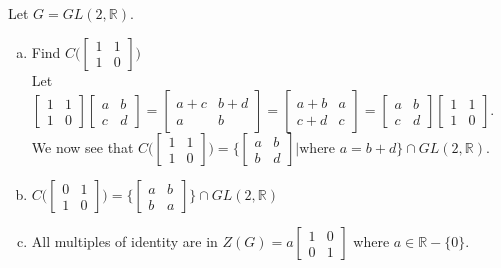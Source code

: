 \documentclass[12pt]{article}
\makeatletter
\theoremstyle{homework}
\newenvironment{exercise}[1]
{\def\@currentlabel{#1}\exercisecore}
{\endexercisecore}
\makeatother
\begin{document}
\begin{exercise}
{3.79}
Let $G = GL(2, \mathbb{R})$.
\begin{enumerate}[(a)]
\item
Find $C\biggr ( \begin{bmatrix}
1&1\\1&0
\end{bmatrix} \biggr )$\\
Let $\begin{bmatrix} 1&1\\1&0\end{bmatrix} \begin{bmatrix} a&b\\c&d\end{bmatrix}=\begin{bmatrix} a+c&b+d\\a&b\end{bmatrix}=\begin{bmatrix} a+b&a\\c+d&c\end{bmatrix}=\begin{bmatrix} a&b\\c&d\end{bmatrix} \begin{bmatrix} 1&1\\1&0\end{bmatrix}$.  We now see that $C\biggr ( \begin{bmatrix} 1&1\\1&0 \end{bmatrix} \biggr ) =\biggr\{\begin{bmatrix} a&b\\b&d \end{bmatrix}\biggr | \text{where }a=b+d \biggr\}\cap GL(2, \mathbb{R})$.
\item
$C\biggr ( \begin{bmatrix} 0&1\\1&0 \end{bmatrix} \biggr )=\biggr\{\begin{bmatrix} a&b\\b&a \end{bmatrix}\biggr\}\cap GL(2, \mathbb{R})$
\item
All multiples of identity are in $Z(G)=a\begin{bmatrix}
1&0\\0&1
\end{bmatrix}$ where $a\in\mathbb{R}-\{0\}$.
\end{enumerate}
\end{exercise}
\end{document}
